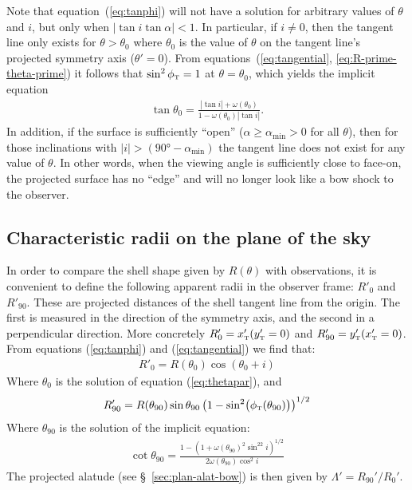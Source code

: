 Note that equation~(\ref{eq:tanphi}) will not have a solution for
arbitrary values of $\theta$ and $i$, but only when
$|\tan i\tan\alpha|<1$. In particular, if $i\neq 0$, then the tangent line
only exists for \(\theta > \theta_{0}\) where \(\theta_{0}\) is the value of
\(\theta\) on the tangent line's projected symmetry axis
(\(\theta' = 0\)).  From equations~(\ref{eq:tangential},
\ref{eq:R-prime-theta-prime}) it follows that \(\sin^2\phi_{\mathrm{\scriptscriptstyle T}} = 1\) at
\(\theta = \theta_0\), which yields the implicit equation
\begin{align}
\tan\theta_{0} = \frac{|\tan i| + \omega(\theta_{0})}{1-\omega(\theta_{0}) |\tan i|} . 
\label{eq:thetapar}
\end{align}
In addition, if the surface is sufficiently ``open''
(\(\alpha \ge \alpha_{\mathrm{min}} > 0\) for all \(\theta\)), then for those
inclinations with
\(\vert i\vert > (\ang{90} - \alpha_{\mathrm{min}}) \) the tangent line does not exist
for any value of \(\theta\).  In other words, when the viewing angle is
sufficiently close to face-on, the projected surface has no ``edge''
and will no longer look like a bow shock to the observer.

\subsection{Characteristic radii on the plane of the sky}

In order to compare the shell shape given by $R(\theta)$ with observations,
it is convenient to define the following apparent radii in the
observer frame: $R'_{0}$ and $R'_{90}$. These are projected distances
of the shell tangent line from the origin. The first is measured in
the direction of the symmetry axis, and the second in a perpendicular
direction. More concretely $R'_{0} = x'_{\mathrm{\scriptscriptstyle T}}(y'_{\mathrm{\scriptscriptstyle T}}=0)$ and
$R'_{90} = y'_{\mathrm{\scriptscriptstyle T}}(x'_{\mathrm{\scriptscriptstyle T}}=0)$. From equations (\ref{eq:tanphi}) and
(\ref{eq:tangential}) we find that:
\begin{align}
R'_{0} = R(\theta_{0})\cos(\theta_{0} + i) \label{eq:Rpar} 
\end{align}
Where $\theta_{0}$ is the solution of equation (\ref{eq:thetapar}), and
\begin{align}
  \label{eq:R90prime}
R'_{90} = R(\theta_{90})\sin\theta_{90}\left(1-\sin^2\bigl(\phi_{\mathrm{\scriptscriptstyle T}}(\theta_{90})\bigr)\right)^{1/2}
\end{align}
Where $\theta_{90}$ is the solution of the implicit equation:
\begin{align}
  \label{eq:th90}
\cot\theta_{90} = \frac{1-\left(1+\omega(\theta_{90})^2\sin^22i\right)^{1/2}}{2\omega(\theta_{90})\cos^2 i}
\end{align}
The projected alatude (see \S~\ref{sec:plan-alat-bow}) is then given
by \(\Lambda' = R_{90}' / R_0'\).

